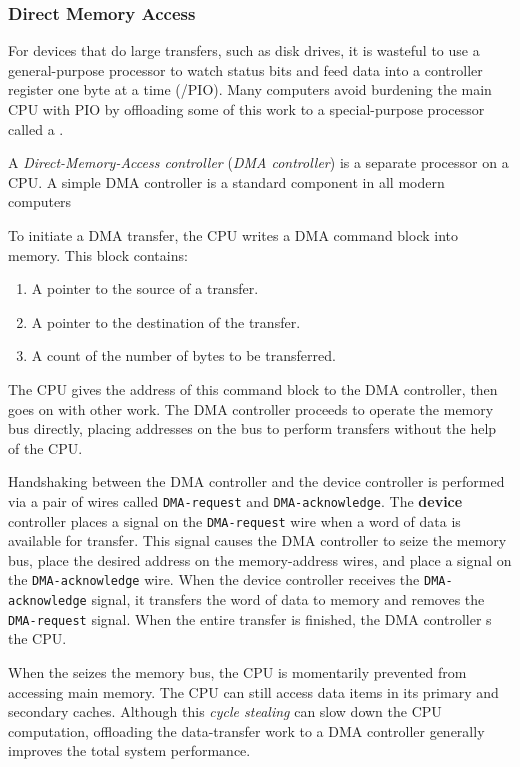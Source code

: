 \subsubsection{Direct Memory Access}\label{subsubsec:Direct_Memory_Access}
For devices that do large transfers, such as disk drives, it is wasteful to use a general-purpose processor to watch status bits and feed data into a controller register one byte at a time (/PIO).
Many computers avoid burdening the main CPU with PIO by offloading some of this work to a special-purpose processor called a .

\begin{definition}\label{def:Direct_Memory_Access_Controller}
  A \emph{Direct-Memory-Access controller} (\emph{DMA controller}) is a separate processor on a CPU.\@
  A simple DMA controller is a standard component in all modern computers

  To initiate a DMA transfer, the CPU writes a DMA command block into memory.
  This block contains:
  \begin{enumerate}[noitemsep]
  \item A pointer to the source of a transfer.
  \item A pointer to the destination of the transfer.
  \item A count of the number of bytes to be transferred.
  \end{enumerate}
  The CPU gives the address of this command block to the DMA controller, then goes on with other work.
  The DMA controller proceeds to operate the memory bus directly, placing addresses on the bus to perform transfers without the help of the CPU.\@

  Handshaking between the DMA controller and the device controller is performed via a pair of wires called \texttt{DMA-request} and \texttt{DMA-acknowledge}.
  The \textbf{device} controller places a signal on the \texttt{DMA-request} wire when a word of data is available for transfer.
  This signal causes the DMA controller to seize the memory bus, place the desired address on the memory-address wires, and place a signal on the \texttt{DMA-acknowledge} wire.
  When the device controller receives the \texttt{DMA-acknowledge} signal, it transfers the word of data to memory and removes the \texttt{DMA-request} signal.
  When the entire transfer is finished, the DMA controller s the CPU.\@

  \begin{remark}\label{rmk:Cycle_Stealing}
    When the  seizes the memory bus, the CPU is momentarily prevented from accessing main memory.
    The CPU can still access data items in its primary and secondary caches.
    Although this \emph{cycle stealing} can slow down the CPU computation, offloading the data-transfer work to a DMA controller generally improves the total system performance.
  \end{remark}


\end{definition}
